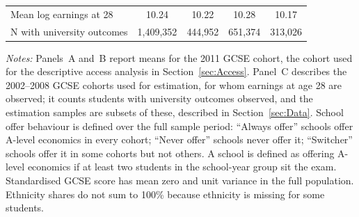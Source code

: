 \begin{table}[htbp]
\begin{tabular}{l cccc}
\midrule
Mean log earnings at 28       & 10.24         & 10.22         & 10.28         & 10.17         \\
N with university outcomes    & 1,409,352         & 444,952         & 651,374         & 313,026         \\
\bottomrule
\end{tabular}
\begin{minipage}{\textwidth}
\smallskip
\footnotesize
\textit{Notes:} Panels~A and~B report means for the 2011 GCSE cohort, the cohort used for the descriptive access analysis in Section~\ref{sec:Access}. Panel~C describes the 2002--2008 GCSE cohorts used for estimation, for whom earnings at age 28 are observed; it counts students with university outcomes observed, and the estimation samples are subsets of these, described in Section~\ref{sec:Data}. School offer behaviour is defined over the full sample period: ``Always offer'' schools offer A-level economics in every cohort; ``Never offer'' schools never offer it; ``Switcher'' schools offer it in some cohorts but not others. A school is defined as offering A-level economics if at least two students in the school-year group sit the exam. Standardised GCSE score has mean zero and unit variance in the full population. Ethnicity shares do not sum to 100\% because ethnicity is missing for some students.
\end{minipage}
\end{table}
